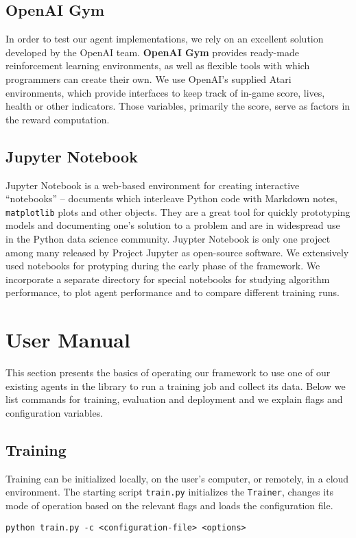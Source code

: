 \subsection*{OpenAI Gym}
In order to test our agent implementations, we rely on an excellent solution developed by the OpenAI team.
\textbf{OpenAI Gym} \cite{openai-gym} provides ready-made reinforcement learning environments, as well as flexible tools with which programmers can create their own.
We use OpenAI's supplied Atari environments, which provide interfaces to keep track of in-game score, lives, health or other indicators.
Those variables, primarily the score, serve as factors in the reward computation.

\subsection*{Jupyter Notebook}
Jupyter Notebook is a web-based environment for creating interactive ``notebooks'' -- documents which interleave Python code with Markdown notes, \texttt{matplotlib} plots and other objects.
They are a great tool for quickly prototyping models and documenting one's solution to a problem and are in widespread use in the Python data science community.
Juypter Notebook is only one project among many released by Project Jupyter as open-source software.
We extensively used notebooks for protyping during the early phase of the framework.
We incorporate a separate directory for special notebooks for studying algorithm performance, to plot agent performance and to compare different training runs.

\section{User Manual} \label{section:user-manual}
This section presents the basics of operating our framework to use one of our existing agents in the library to run a training job and collect its data.
Below we list commands for training, evaluation and deployment and we explain flags and configuration variables.

\subsection*{Training}
Training can be initialized locally, on the user's computer, or remotely, in a cloud environment.
The starting script \verb|train.py| initializes the \verb|Trainer|, changes its mode of operation based on the relevant flags and loads the configuration file.
\begin{verbatim}
python train.py -c <configuration-file> <options>
\end{verbatim}

